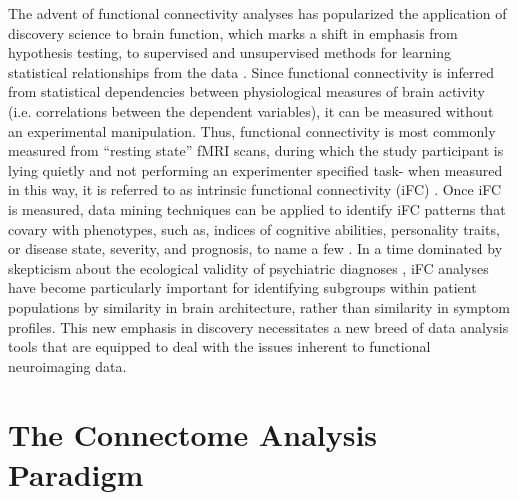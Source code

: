 The advent of functional connectivity analyses has popularized the application of discovery science to brain function, which marks a shift in emphasis from hypothesis testing, to supervised and unsupervised methods for learning statistical relationships from the data \cite{Biswal2010}. Since functional connectivity is inferred from statistical dependencies between physiological measures of brain activity (i.e. correlations between the dependent variables), it can be measured without an experimental manipulation. Thus, functional connectivity is most commonly measured from ``resting state'' fMRI scans, during which the study participant is lying quietly and not performing an experimenter specified task- when measured in this way, it is referred to as intrinsic functional connectivity (iFC) \cite{Biswal1995}. Once iFC is measured, data mining techniques can be applied to identify iFC patterns that covary with phenotypes, such as, indices of cognitive abilities, personality traits, or disease state, severity, and prognosis, to name a few \cite{Varoquaux2013}. In a time dominated by skepticism about the ecological validity of psychiatric diagnoses \cite{Kapur2012}, iFC analyses have become particularly important for identifying subgroups within patient populations by similarity in brain architecture, rather than similarity in symptom profiles. This new emphasis in discovery necessitates a new breed of data analysis tools that are equipped to deal with the issues inherent to functional neuroimaging data.

\section{The Connectome Analysis Paradigm}

